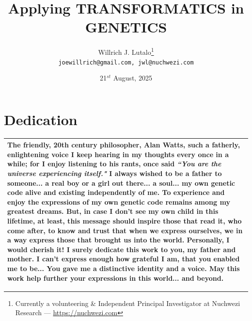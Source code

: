 \documentclass[a4paper, 18pt]{book} %
\title{Applying \textbf{TRANSFORMATICS} in GENETICS}
\author{Willrich J. Lutalo\thanks{Currently a volunteering \& Independent Principal Investigator at Nuchwezi Research --- \url{https://nuchwezi.com}}\\
\texttt{joewillrich@gmail.com, jwl@nuchwezi.com}}
\date{21$^{st}$ August, 2025}
\begin{document}
\frontmatter








\maketitle

\chapter*{Dedication}


\begin{table}[H]
  \centering
  \Huge
	\begin{tabular}[t]{|p{}}
The friendly, 20th century philosopher, \textbf{Alan Watts}, \small such a fatherly, enlightening voice I keep hearing in my thoughts every once in a while; for I enjoy listening to his rants, once said \Huge \textit{``You are the universe experiencing itself."} \Large I always wished to be a father to someone... \textbf{a real boy or a girl out there... a soul... my own genetic code alive and existing independently of me}. To experience and enjoy the expressions of my own genetic code remains among my greatest dreams. But, in case I don't see my own child in this lifetime, at least, this message should inspire those that read it, who come after, to know and trust that when we express ourselves, we in a way express those that brought us into the world. Personally, I would cherish it! I surely dedicate this work to you, my father and mother. \Large I can't express enough how grateful I am, that you enabled me to be... You gave me a distinctive identity and a voice. \Huge \textbf{May this work help further your expressions in this world... and beyond.}\\
	\hline
	              
\end{tabular}
  \label{TABDEDC}
\end{table}

\tableofcontents

\listoffigures

\listoftables

\newpage

\Large
\end{document}

